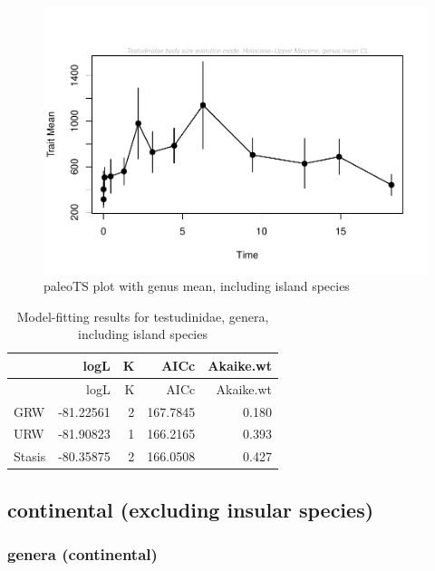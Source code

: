 \documentclass[]{article}
\begin{document}
\begin{figure}[htbp]
\centering
\includegraphics{MA_JJ_files/figure-latex/paleoTS plot with genus mean, including island species-1.pdf}
\caption{paleoTS plot with genus mean, including island species}
\end{figure}

\begin{longtable}[]{@{}lrrrr@{}}
\caption{Model-fitting results for testudinidae, genera, including
island species}\tabularnewline
\toprule
& logL & K & AICc & Akaike.wt\tabularnewline
\midrule
\endfirsthead
\toprule
& logL & K & AICc & Akaike.wt\tabularnewline
\midrule
\endhead
GRW & -81.22561 & 2 & 167.7845 & 0.180\tabularnewline
URW & -81.90823 & 1 & 166.2165 & 0.393\tabularnewline
Stasis & -80.35875 & 2 & 166.0508 & 0.427\tabularnewline
\bottomrule
\end{longtable}

\newpage

\subsection{continental (excluding insular
species)}\label{continental-excluding-insular-species}

\subsubsection{genera (continental)}\label{genera-continental}
\end{document}
